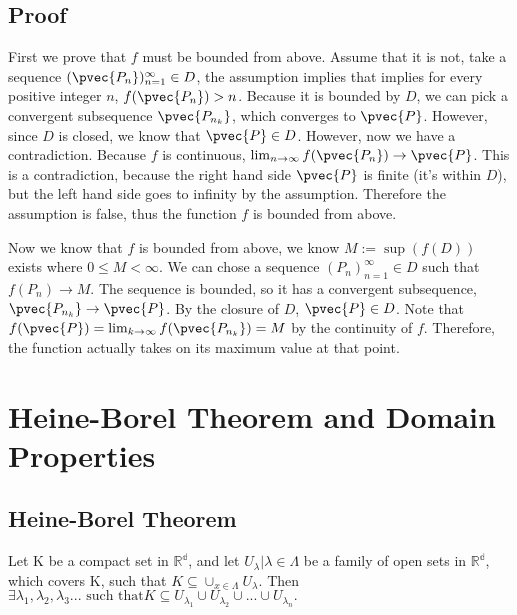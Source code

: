 \documentclass[11 pt, twoside]{article}
\begin{document}
\subsection{Proof}
First we prove that $f$ must be bounded from above. Assume that it is not, take
a sequence $(\pvec{P_n})_{n=1}^\infty \in D$, the assumption implies that
implies for every positive integer $n$, $f(\pvec{P_n}) > n$. Because it is bounded by
$D$, we can pick a convergent subsequence $\pvec{P_{n_k}}$, which converges to
$\pvec{P}$. However, since $D$ is closed, we know that $\pvec{P} \in D$. However, now we have a contradiction. Because
$f$ is continuous, $\lim_{n\to\infty}f(\pvec{P_n}) \to \pvec{P}$. This is a contradiction,
because the right hand side $\pvec{P}$ is finite (it's within $D$), but the left hand
side goes to infinity by the assumption. Therefore the assumption is false,
thus the function $f$ is bounded from above.

Now we know that $f$ is bounded from above, we know $M := \sup{(f(D))}$ exists
where $0\leq M < \infty$. We can chose a sequence $(P_n)_{n = 1}^\infty \in D$
such that $f(P_n) \to M$. The sequence is bounded, so it has a convergent
subsequence, $\pvec{P_{n_k}} \to \pvec{P}$. By the closure of $D$, $\pvec{P} \in
D$. Note that $f(\pvec{P}) = \lim_{k\to\infty} f(\pvec{P_{n_k}}) = M$ by the
continuity of $f$. Therefore, the function actually takes on its maximum value
at that point.

\section{Heine-Borel Theorem and Domain Properties}

\subsection{Heine-Borel Theorem}
Let K be a compact set in $\mathbb{R^d}$, and let ${U_\lambda | \lambda \in \Lambda}$ be a family of open sets in $\mathbb{R^d}$, which covers K, such that $K \subseteq \cup_{x \in \Lambda}U_\lambda$. Then $\exists \lambda_1, \lambda_2, \lambda_3 \text{... such that} K \subseteq U_{\lambda_1} \cup U_{\lambda_2} \cup \text{...} \cup U_{\lambda_n}.$
\end{document}
